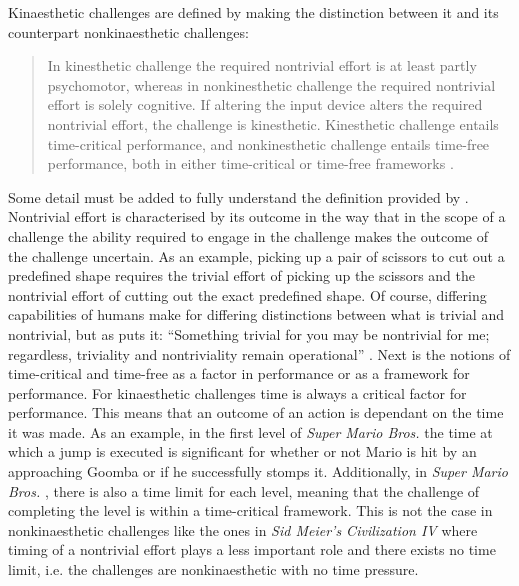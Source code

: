 Kinaesthetic challenges are defined by making the distinction between it and its counterpart nonkinaesthetic challenges:
\begin{quote}
  In kinesthetic challenge the required nontrivial effort is at least partly psychomotor, whereas in nonkinesthetic challenge the required nontrivial effort is solely cognitive. If altering the input device alters the required nontrivial effort, the challenge is kinesthetic. Kinesthetic challenge entails time-critical performance, and nonkinesthetic challenge entails time-free performance, both in either time-critical or time-free frameworks \cite{karhulahti}.
\end{quote}
Some detail must be added to fully understand the definition provided by . Nontrivial effort is characterised by its outcome in the way that in the scope of a challenge the ability required to engage in the challenge makes the outcome of the challenge uncertain. As an example, picking up a pair of scissors to cut out a predefined shape requires the trivial effort of picking up the scissors and the nontrivial effort of cutting out the exact predefined shape. Of course, differing capabilities of humans make for differing distinctions between what is trivial and nontrivial, but as  puts it: ``Something trivial for you may be nontrivial for me; regardless, triviality and nontriviality remain operational'' \cite{karhulahti}. Next is the notions of time-critical and time-free as a factor in performance or as a framework for performance. For kinaesthetic challenges time is always a critical factor for performance. This means that an outcome of an action is dependant on the time it was made. As an example, in the first level of \textit{Super Mario Bros.} \cite{mario} the time at which a jump is executed is significant for whether or not Mario is hit by an approaching Goomba or if he successfully stomps it. Additionally, in \textit{Super Mario Bros.} \cite{mario}, there is also a time limit for each level, meaning that the challenge of completing the level is within a time-critical framework. This is not the case in nonkinaesthetic challenges like the ones in \textit{Sid Meier's Civilization IV} where timing of a nontrivial effort plays a less important role and there exists no time limit, i.e. the challenges are nonkinaesthetic with no time pressure.

